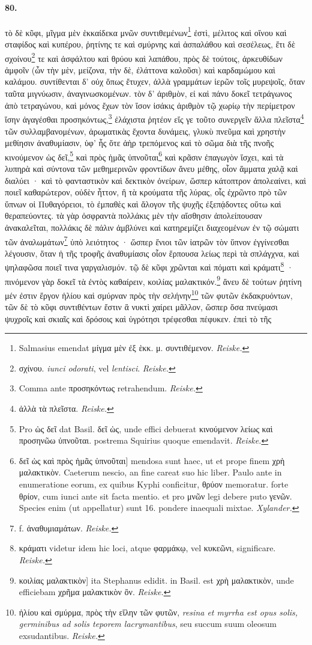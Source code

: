 \documentclass[a4paper, 11pt, oneside, polutonikogreek, german]{article}
\begin{document}
\paragraph{80.}
τὸ δὲ κῦφι, μῖγμα μὲν ἑκκαίδεκα μνῶν συντιθεμένων\footnote{Salmasius emendat μίγμα μὲν ἐξ ἑκκ. μ. συντιθέμενον. \emph{Reiske.}} ἐστὶ, μέλιτος καὶ οἴνου καὶ σταφίδος καὶ κυπέρου, ῥητίνης τε καὶ σμύρνης καὶ ἀσπαλάθου καὶ σεσέλεως, ἔτι δὲ σχοίνου\footnote{σχίνου. \emph{iunci odorati}, vel \emph{lentisci}. \emph{Reiske.}} τε καὶ ἀσφάλτου καὶ θρύου καὶ λαπάθου, πρὸς δὲ τούτοις, ἀρκευθίδων ἀμφοῖν (ὧν τὴν μὲν, μείζονα, τὴν δὲ, ἐλάττονα καλοῦσι) καὶ καρδαμώμου καὶ καλάμου. συντίθενται δ' οὐχ ὅπως ἔτυχεν, ἀλλὰ γραμμάτων ἱερῶν τοῖς μυρεψοῖς, ὅταν ταῦτα μιγνύωσιν, ἀναγινωσκομένων. τὸν δ' ἀριθμὸν, εἰ καὶ πάνυ δοκεῖ τετράγωνος ἀπὸ τετραγώνου, καὶ μόνος ἔχων τὸν ἴσον ἰσάκις ἀριθμὸν τῷ χωρίῳ τὴν περίμετρον ἴσην ἀγαγέσθαι προσηκόντως,\footnote{Comma ante προσηκόντως retrahendum. \emph{Reiske.}} ἐλάχιστα ῥητέον εἴς γε τοῦτο συνεργεῖν ἄλλα πλεῖστα\footnote{ἀλλὰ τὰ πλεῖστα. \emph{Reiske.}} τῶν συλλαμβανομένων, ἀρωματικὰς ἔχοντα δυνάμεις, γλυκὺ πνεῦμα καὶ χρηστὴν μεθίησιν ἀναθυμίασιν, ὑφ' ἧς ὅτε ἀὴρ τρεπόμενος καὶ τὸ σῶμα διὰ τῆς πνοῆς κινούμενον ὡς δεῖ,\footnote{Pro ὡς δεῖ dat Basil. δεῖ ὡς, unde effici debuerat κινούμενον λείως καὶ προσηνῶω ὑπνοῦται. postrema Squirius quoque emendavit. \emph{Reiske.}} καὶ πρὸς ἡμᾶς ὑπνοῦται\footnote{δεῖ ὡς καὶ πρὸς ἡμᾶς ὑπνοῦται] mendosa sunt haec, ut et prope finem χρὴ μαλακτικὸν. Caeterum nescio, an fine careat suo hic liber. Paulo ante in enumeratione eorum, ex quibus Kyphi conficitur, θρύον memoratur. forte θρίον, cum iunci ante sit facta mentio. et pro μνῶν legi debere puto γενῶν. Species enim (ut appellatur) sunt 16. pondere inaequali mixtae. \emph{Xylander.} } καὶ κρᾶσιν ἐπαγωγὸν ἴσχει, καὶ τὰ λυπηρὰ καὶ σύντονα τῶν μεθημερινῶν φροντίδων ἄνευ μέθης, οἷον ἅμματα χαλᾷ καὶ διαλύει · καὶ τὸ φανταστικὸν καὶ δεκτικὸν ὀνείρων, ὥσπερ κάτοπτρον ἀπολεαίνει, καὶ ποιεῖ καθαρώτερον, οὐδὲν ἧττον, ἢ τὰ κρούματα τῆς λύρας, οἷς ἐχρῶντο πρὸ τῶν ὕπνων οἱ Πυθαγόρειοι, τὸ ἐμπαθὲς καὶ ἄλογον τῆς ψυχῆς ἐξεπᾴδοντες οὕτω καὶ θεραπεύοντες. τὰ γὰρ ὀσφραντὰ πολλάκις μὲν τὴν αἴσθησιν ἀπολείπουσαν ἀνακαλεῖται, πολλάκις δὲ πάλιν ἀμβλύνει καὶ κατηρεμίζει διαχεομένων ἐν τῷ σώματι τῶν ἀναλωμάτων\footnote{f. ἀναθυμιαμάτων. \emph{Reiske.}} ὑπὸ λειότητος · ὥσπερ ἔνιοι τῶν ἰατρῶν τὸν ὕπνον ἐγγίνεσθαι λέγουσιν, ὅταν ἡ τῆς τροφῆς ἀναθυμίασις οἷον ἕρπουσα λείως περὶ τὰ σπλάγχνα, καὶ ψηλαφῶσα ποιεῖ τινα γαργαλισμόν. τῷ δὲ κῦφι χρῶνται καὶ πόματι καὶ κράματι\footnote{κράματι videtur idem hic loci, atque φαρμάκῳ, vel κυκεῶνι, significare. \emph{Reiske.}} · πινόμενον γὰρ δοκεῖ τὰ ἐντὸς καθαίρειν, κοιλίας μαλακτικόν.\footnote{κοιλίας μαλακτικὸν] ita Stephanus edidit. in Basil. est χρὴ μαλακτικὸν, unde efficiebam χρῆμα μαλακτικὸν ὂν. \emph{Reiske.}} ἄνευ δὲ τούτων ῥητίνη μέν ἐστιν ἔργον ἡλίου καὶ σμύρναν πρὸς τὴν σελήνην\footnote{ἡλίου καὶ σμύρμα, πρὸς τὴν εἵλην τῶν φυτῶν, \emph{resina et myrrha est opus solis, germinibus ad solis teporem lacrymantibus}, seu succum suum oleosum exsudantibus. \emph{Reiske.}} τῶν φυτῶν ἐκδακρυόντων, τῶν δὲ τὸ κῦφι συντιθέντων ἔστιν ἃ νυκτὶ χαίρει μᾶλλον, ὥσπερ ὅσα πνεύμασι ψυχροῖς καὶ σκιαῖς καὶ δρόσοις καὶ ὑγρότησι τρέφεσθαι πέφυκεν. ἐπεὶ τὸ τῆς 
\end{document}
